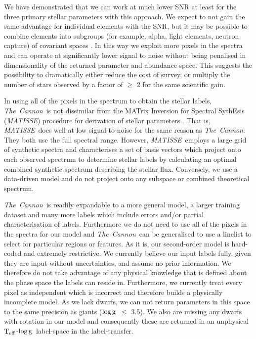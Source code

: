 \documentclass[12pt, preprint]{aastex}
\newcommand{\tc}{\textsl{The~Cannon}}
\newcommand{\matisse}{\textsl{MATISSE}}
\newcommand{\teff}{\mbox{$\rm T_{eff}$}}
\newcommand{\logg}{\mbox{$\rm \log g$}}
\begin{document}
We have demonstrated that we can work at much lower SNR at least for the three primary stellar parameters with this approach. 
We expect to not gain the same advantage for individual elements with the SNR, but it may be possible to combine elements into subgroups (for example, alpha, light elements, neutron capture) of covariant spaces \citep[e.g.,][]{Ting2012}. In this way we exploit more pixels in the spectra and can operate at significantly lower signal to noise without being penalised in dimensionality of the returned parameter and abundance space. 
This suggests the possibility to dramatically either reduce the cost of survey, or multiply the number of stars observed by a factor of $\ge$ 2 for the same scientific gain. 

In using all of the pixels in the spectrum to obtain the
stellar labels, \tc\ is not dissimilar from the MATrix Inversion for
Spectral SythEsis (\matisse) procedure for derivation of stellar
parameters \citep{RB2006}.
That is, \matisse\ does well at low signal-to-noise for the same
reason as \tc:  They both use the full spectral range.
However, \matisse\ employs a large grid of synthetic spectra and
characterises a set of basis vectors which project onto each observed
spectrum to determine stellar labels by calculating an optimal
combined synthetic spectrum describing the stellar flux.
Conversely, we use a data-driven model and do not project onto any
subspace or combined theoretical spectrum.

 \tc\ is readily expandable to a more general model, a larger training dataset and many more labels which include errors and/or partial characterisation of labels. Furthermore we do not need to use all of the pixels in the spectra for our model and \tc\ can be generalised to use a linelist to select for particular regions or features.
 As it is, our second-order model is hard-coded and extremely restrictive. 
 We currently believe our input labels fully, given they are input without uncertainties, and assume no prior information. 
 We therefore do not take advantage of any physical knowledge that is defined about the phase space the labels can reside in.  
 Furthermore, we currently treat every pixel as independent which is incorrect and therefore builds a physically incomplete model.  As we lack dwarfs, we can not return parameters in this space to the same precision as giants (\logg\ $\le$ 3.5).  
 We also are missing any dwarfs with rotation in our model and consequently these are returned in an unphysical \teff-\logg\ label-space in the label-transfer. 
\end{document}
